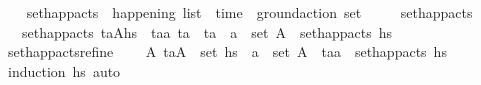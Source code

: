 \begin{isabellebody}
\begin{isamarkuptext}
\end{isamarkuptext}\isamarkuptrue%
\ \ \isamarkupfalse%
\ set{\isacharunderscore}{\kern0pt}happ{\isacharunderscore}{\kern0pt}acts\ {\isacharcolon}{\kern0pt}{\isacharcolon}{\kern0pt}\ {\isachardoublequoteopen}happening\ list\ {\isasymRightarrow}\ {\isacharparenleft}{\kern0pt}time\ {\isasymtimes}\ ground{\isacharunderscore}{\kern0pt}action{\isacharparenright}{\kern0pt}\ set{\isachardoublequoteclose}\ \isanewline
\ \ \ \ {\isachardoublequoteopen}set{\isacharunderscore}{\kern0pt}happ{\isacharunderscore}{\kern0pt}acts\ {\isacharbrackleft}{\kern0pt}{\isacharbrackright}{\kern0pt}\ {\isacharequal}{\kern0pt}\ {\isacharbraceleft}{\kern0pt}{\isacharbraceright}{\kern0pt}{\isachardoublequoteclose}\isanewline
\ \ {\isacharbar}{\kern0pt}\ {\isachardoublequoteopen}set{\isacharunderscore}{\kern0pt}happ{\isacharunderscore}{\kern0pt}acts\ {\isacharparenleft}{\kern0pt}{\isacharparenleft}{\kern0pt}t\isactrlsub a{\isacharcomma}{\kern0pt}A{\isacharparenright}{\kern0pt}{\isacharhash}{\kern0pt}hs{\isacharparenright}{\kern0pt}\ {\isacharequal}{\kern0pt}\ {\isacharbraceleft}{\kern0pt}{\isacharparenleft}{\kern0pt}t\isactrlsub a{\isacharprime}{\kern0pt}{\isacharcomma}{\kern0pt}a{\isacharprime}{\kern0pt}{\isacharparenright}{\kern0pt}{\isachardot}{\kern0pt}\ t\isactrlsub a\ {\isacharequal}{\kern0pt}\ t\isactrlsub a{\isacharprime}{\kern0pt}\ {\isasymand}\ a{\isacharprime}{\kern0pt}\ {\isasymin}\ set\ A{\isacharbraceright}{\kern0pt}\ {\isasymunion}\ set{\isacharunderscore}{\kern0pt}happ{\isacharunderscore}{\kern0pt}acts\ hs{\isachardoublequoteclose}\isanewline
\isanewline
\ \ \isamarkupfalse%
\ set{\isacharunderscore}{\kern0pt}happ{\isacharunderscore}{\kern0pt}acts{\isacharunderscore}{\kern0pt}refine{\isacharcolon}{\kern0pt}\isanewline
\ \ \ \ {\isachardoublequoteopen}{\isacharparenleft}{\kern0pt}{\isasymexists}A{\isachardot}{\kern0pt}\ {\isacharparenleft}{\kern0pt}t\isactrlsub a{\isacharcomma}{\kern0pt}A{\isacharparenright}{\kern0pt}\ {\isasymin}\ set\ hs\ {\isasymand}\ a\ {\isasymin}\ set\ A{\isacharparenright}{\kern0pt}\ {\isasymlongleftrightarrow}\ {\isacharparenleft}{\kern0pt}{\isacharparenleft}{\kern0pt}t\isactrlsub a{\isacharcomma}{\kern0pt}a{\isacharparenright}{\kern0pt}\ {\isasymin}\ set{\isacharunderscore}{\kern0pt}happ{\isacharunderscore}{\kern0pt}acts\ hs{\isacharparenright}{\kern0pt}{\isachardoublequoteclose}\isanewline
%
\isadelimproof
\ \ \ \ %
\endisadelimproof
%
\isatagproof
{}\isamarkupfalse%
\ {\isacharparenleft}{\kern0pt}induction\ hs{\isacharparenright}{\kern0pt}\ auto%

\end{isabellebody}
